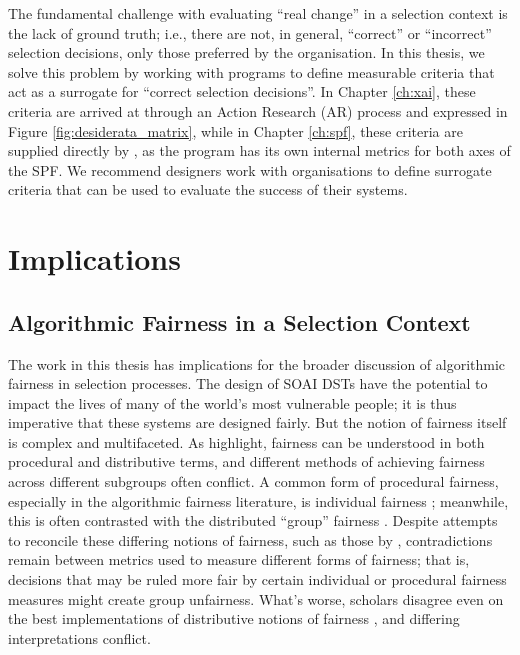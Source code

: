 The fundamental challenge with evaluating ``real change'' in a selection context is the lack of ground truth; i.e., there are not, in general, ``correct'' or ``incorrect'' selection decisions, only those preferred by the organisation. In this thesis, we solve this problem by working with programs to define measurable criteria that act as a surrogate for ``correct selection decisions''. In Chapter \ref{ch:xai}, these criteria are arrived at through an Action Research (AR) process and expressed in Figure \ref{fig:desiderata_matrix}, while in Chapter \ref{ch:spf}, these criteria are supplied directly by \rise, as the program has its own internal metrics for both axes of the SPF. We recommend designers work with organisations to define surrogate criteria that can be used to evaluate the success of their systems.

\section{Implications}
\subsection{Algorithmic Fairness in a Selection Context}
The work in this thesis has implications for the broader discussion of algorithmic fairness in selection processes. The design of SOAI DSTs have the potential to impact the lives of many of the world's most vulnerable people; it is thus imperative that these systems are designed fairly. But the notion of fairness itself is complex and multifaceted. As \textcite{pmlr-v80-kearns18a} highlight, fairness can be understood in both procedural and distributive terms, and different methods of achieving fairness across different subgroups often conflict. A common form of procedural fairness, especially in the algorithmic fairness literature, is individual fairness \cite{dwork_fairness_2012}; meanwhile, this is often contrasted with the distributed ``group'' fairness \cite{fleisher_whats_nodate,binns_apparent_2019,barocas2023fairness,Friedler_Scheidegger_Venkatasubramanian_2016}. Despite attempts to reconcile these differing notions of fairness, such as those by \textcite{binns_apparent_2019}, contradictions remain between metrics used to measure different forms of fairness; that is, decisions that may be ruled more fair by certain individual or procedural fairness measures might create group unfairness. What's worse, scholars disagree even on the best implementations of distributive notions of fairness \cite{Friedler_Scheidegger_Venkatasubramanian_2016}, and differing interpretations conflict. 


